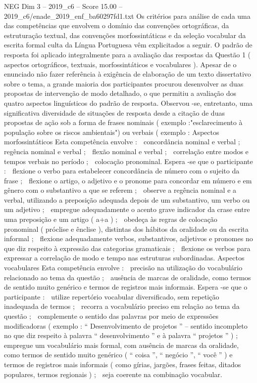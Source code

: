 \begin{textsample}{NEG Dim 3 – 2019\_c6 – Score 15.00 – 2019\_c6/enade\_2019\_enf\_ba60297fd1.txt}
Os critérios para análise de cada uma das competências que envolvem o domínio das convenções ortográficas, da estruturação textual, das convenções morfossintáticas e da seleção vocabular da escrita formal culta da Língua Portuguesa vêm explicitados a seguir.
O padrão de resposta foi aplicado integralmente para a avaliação das respostas da Questão 1 ( aspectos ortográficos, textuais, morfossintáticos e vocabulares ).
Apesar de o enunciado não fazer referência à exigência de elaboração de um texto dissertativo sobre o tema, a grande maioria dos participantes procurou desenvolver as duas propostas de intervenção de modo detalhado, o que permitiu a avaliação dos quatro aspectos linguísticos do padrão de resposta.
Observou -se, entretanto, uma significativa diversidade de situações de resposta desde a citação de duas propostas de ação sob a forma de frases nominais ( exemplo :"esclarecimento à população sobre os riscos ambientais") ou verbais ( exemplo : Aspectos morfossintáticos Esta competência envolve :  concordância nominal e verbal ;  regência nominal e verbal ;  flexão nominal e verbal ;  correlação entre modos e tempos verbais no período ;  colocação pronominal.
Espera -se que o participante :  flexione o verbo para estabelecer concordância de número com o sujeito da frase ;  flexione o artigo, o adjetivo e o pronome para concordar em número e em gênero com o substantivo a que se referem ;  observe a regência nominal e a verbal, utilizando a preposição adequada depois de um substantivo, um verbo ou um adjetivo ;  empregue adequadamente o acento grave indicador da crase entre uma preposição e um artigo ( a+a ) ;  obedeça às regras de colocação pronominal ( próclise e ênclise ), distintas dos hábitos da oralidade ou da escrita informal ;  flexione adequadamente verbos, substantivos, adjetivos e pronomes no que diz respeito à expressão das categorias gramaticais ;  flexione os verbos para expressar a correlação de modo e tempo nas estruturas subordinadas.
Aspectos vocabulares Esta competência envolve :  precisão na utilização do vocabulário relacionado ao tema da questão ;  ausência de marcas de oralidade, como termos de sentido muito genérico e termos de registros mais informais.
Espera -se que o participante :  utilize repertório vocabular diversificado, sem repetição inadequada de termos ;  recorra a vocabulário preciso em relação ao tema da questão ;  complemente o sentido das palavras por meio de expressões modificadoras ( exemplo : “ Desenvolvimento de projetos ” – sentido incompleto no que diz respeito à palavra “ desenvolvimento ” e à palavra “ projetos ” ) ;  empregue um vocabulário mais formal, com ausência de marcas da oralidade, como termos de sentido muito genérico ( “ coisa ”, “ negócio ”, “ você ” ) e termos de registros mais informais ( como gírias, jargões, frases feitas, ditados populares, termos regionais ) ;  seja coerente na combinação vocabular.

\end{textsample}

